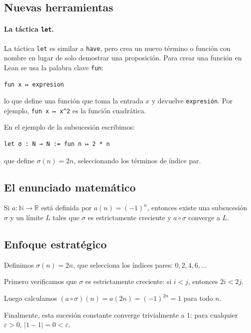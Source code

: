 \subsection{Nuevas herramientas}

\paragraph{La táctica \texttt{let}.}
La táctica \texttt{let} es similar a \texttt{have}, pero crea un nuevo término
o función con nombre en lugar de solo demostrar una proposición. Para crear una
función en Lean se usa la palabra clave \texttt{fun}:
\begin{verbatim}
fun x ↦ expresion
\end{verbatim}
lo que define una función que toma la entrada $x$ y devuelve \texttt{expresión}.
Por ejemplo, \texttt{fun x ↦ x\^{}2} es la función cuadrática.

En el ejemplo de la subsucesión escribimos:

\begin{verbatim}
let σ : N → N := fun n ↦ 2 * n
\end{verbatim}
que define $\sigma(n)=2n$, seleccionando los términos de índice par.

\subsection{El enunciado matemático}

\begin{theorem}
  Si $a:\mathbb{N}\to\mathbb{R}$ está definida por $a(n)=(-1)^n$, entonces existe
  una subsucesión $\sigma$ y un límite $L$ tales que $\sigma$ es estrictamente
  creciente y $a\circ\sigma$ converge a $L$.
\end{theorem}

\subsection{Enfoque estratégico}

Definimos $\sigma(n)=2n$, que selecciona los índices pares: $0,2,4,6,\ldots$

Primero verificamos que $\sigma$ es estrictamente creciente: si $i<j$,
entonces $2i<2j$.

Luego calculamos $(a\circ\sigma)(n)=a(2n)=(-1)^{2n}=1$ para todo $n$.

Finalmente, esta sucesión constante converge trivialmente a $1$: para cualquier
$\varepsilon>0$, $|1-1|=0<\varepsilon$.

